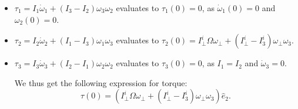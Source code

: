 \begin{itemize}

\item $\tau_1 = I_1 \dot{\omega}_1 + (I_3 - I_2) \omega_3 \omega_2$ evaluates to $\tau_1(0) = 0$, as $\dot{\omega}_1(0) = 0$ and $\omega_2(0) = 0$.

\item $\tau_2 = I_2 \dot{\omega}_2 + (I_1 - I_3) \omega_1 \omega_3$ evaluates to $\tau_2(0) = I_\bot^i \Omega \omega_\bot + (I_\bot^i - I_3^i) \omega_\bot \omega_3$.

\item $\tau_3 = I_3 \dot{\omega}_3 + (I_2 - I_1) \omega_2 \omega_2$ evaluates to $\tau_3(0) = 0$, as $I_1 = I_2$ and $\dot{\omega}_3 = 0$.

We thus get the following expression for torque: $$\boxed{\tau(0) = (I_\bot^i \Omega \omega_\bot + (I_\bot^i - I_3^i) \omega_\bot \omega_3) \hat{e}_2.}$$

\end{itemize}

\begin{comment} To compute the torque, therefore, it suffices to compute $d\vec{L^i}/dt$ for $t = 0$ in the fixed space frame.  We apply the equation $d\vec{L}^i/dt = \partial \vec{L}^i/\partial t + \omega \times \vec{L}^i$.

Consider the first term first.  We have $\vec{\omega} = \omega_\bot \cos (\Omega t + \phi) \hat{e}_1 + \omega_\bot \sin (\Omega t + \phi) \hat{e}_2 + \omega_3 \hat{e}_3$, where $\Omega = \omega_3 (I^i_3 - I^i_\bot)/I^i_\bot$.  Our choice of coordinate system gives us $\phi = 0$, so $\dot{\vec{\omega}}(0) = \omega_\bot \Omega \hat{e}_2$.  As $\vec{L}^i = \overleftrightarrow{I^i} \vec{\omega}$ in the body frame, evaluating $\partial \vec{L}^i/\partial t$ at $t = 0$ gives us $\overleftrightarrow{I^i} \dot{\vec{\omega}}(0) = I^i_\bot \Omega \omega_\bot \hat{e}_2 = (I^i_3 - I^i_\bot) \omega_\bot \omega_3 \hat{e}_2$.

Now consider the second term.  We can take the cross product in the body frame, in which $\vec{L^i} = \overleftrightarrow{I^i} \vec{\omega}$ is still valid.  At $t = 0$, $\vec{\omega} = \omega_\bot \hat{e}_1 + \omega_3 \hat{e}_3$, so $\vec{L^i} = I^i_\bot \omega_\bot \hat{e}_1 + I^i_3 \omega_3 \hat{e}_3$ and $\omega \times \vec{L^i} = - (I^i_3 + I^i_\bot) \omega_\bot \omega_3 \hat{e}_2$.  This gives us our final answer for the torque: $$\boxed{\tau = - 2 I^i_\bot \omega_\bot \omega_e \hat{e}_2.}$$

\end{comment}


